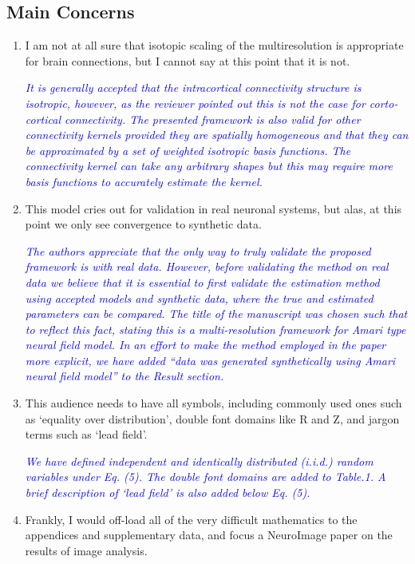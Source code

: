 \documentclass{article}
\newcommand{\parham}[1]{\textcolor{blue}{#1}}
\begin{document}
    \subsection{Main Concerns}
		\begin{enumerate} 
			\item I am not at all sure that isotopic scaling of the multiresolution is appropriate for brain connections, but I cannot say at this point that it is not.
			
			\emph{\parham{It is generally accepted that the intracortical connectivity structure is isotropic, however, as the reviewer pointed out this is not the case  for corto-cortical connectivity. The presented framework is also valid for other connectivity kernels provided they are spatially homogeneous and that they can be approximated by a set of weighted isotropic basis functions. The connectivity kernel can take any arbitrary shapes but this may require more basis functions to accurately estimate the kernel.}}
			 
			\item This model cries out for validation in real neuronal systems, but alas, at this point we only see convergence to synthetic data.   
			 
			 \emph{\parham{The authors appreciate that the only way to truly validate the proposed framework is with real data. However, before validating the method on real data we believe that it is essential to first validate the estimation method using accepted models and synthetic data, where the true and estimated parameters can be compared. The title of the manuscript was chosen such that to reflect this fact, stating this is a multi-resolution framework for Amari type neural field model. In an effort to make the method employed in the paper more explicit, we have added ``data was generated synthetically using Amari neural field model'' to the Result section.}}  
			
			\item This audience needs to have all symbols, including commonly used ones such as `equality over distribution', double font domains like R and Z, and jargon terms such as `lead field'.
			
			\emph{\parham{ We have defined independent and identically distributed (i.i.d.) random variables under Eq. (5). The double font domains are added to Table.1. A brief description of `lead field' is also added below Eq. (5).}}  
			
			\item Frankly, I would off-load all of the very difficult mathematics to the appendices and supplementary data, and focus a NeuroImage paper on the results of image analysis. 
			

\end{enumerate}
\end{document}
